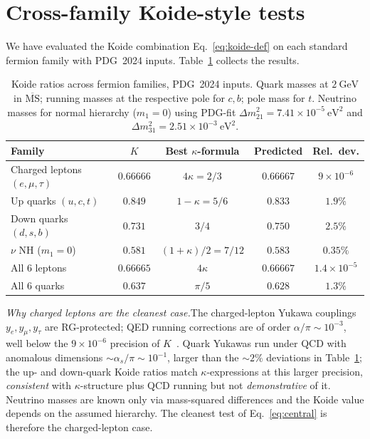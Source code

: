 \documentclass[aps,prl,reprint,amsmath,amssymb,nofootinbib,floatfix,superscriptaddress]{revtex4-2}
\newcommand{\msbar}{\overline{\mathrm{MS}}}
\begin{document}
\section{Cross-family Koide-style tests}
\label{sec:crossfamily}

We have evaluated the Koide combination Eq.~\eqref{eq:koide-def} on each standard fermion family with PDG~2024 inputs. Table~\ref{tab:crossfam} collects the results.

\begin{table}[h]
\centering
\small
\begin{tabular}{lcccc}
\toprule
Family & $K$ & Best $\kappa$-formula & Predicted & Rel.\ dev. \\
\midrule
Charged leptons $(e, \mu, \tau)$ & $0.66666$ & $4\kappa = 2/3$ & $0.66667$ & $9 \times 10^{-6}$ \\
Up quarks $(u, c, t)$ & $0.849$ & $1 - \kappa = 5/6$ & $0.833$ & $1.9\%$ \\
Down quarks $(d, s, b)$ & $0.731$ & $3/4$ & $0.750$ & $2.5\%$ \\
$\nu$ NH ($m_1 = 0$) & $0.581$ & $(1{+}\kappa)/2 = 7/12$ & $0.583$ & $0.35\%$ \\
All 6 leptons & $0.66665$ & $4\kappa$ & $0.66667$ & $1.4 \times 10^{-5}$ \\
All 6 quarks & $0.637$ & $\pi/5$ & $0.628$ & $1.3\%$ \\
\bottomrule
\end{tabular}
\caption{Koide ratios across fermion families, PDG~2024 inputs. Quark masses at $2~\mathrm{GeV}$ in $\msbar$; running masses at the respective pole for $c, b$; pole mass for $t$. Neutrino masses for normal hierarchy ($m_1 = 0$) using PDG-fit $\Delta m^2_{21} = 7.41 \times 10^{-5}~\mathrm{eV}^2$ and $\Delta m^2_{31} = 2.51 \times 10^{-3}~\mathrm{eV}^2$. \label{tab:crossfam}}
\end{table}

\textit{Why charged leptons are the cleanest case.}\quad The charged-lepton Yukawa couplings $y_e, y_\mu, y_\tau$ are RG-protected; QED running corrections are of order $\alpha/\pi \sim 10^{-3}$, well below the $9 \times 10^{-6}$ precision of $K$~\cite{Sumino2009a}. Quark Yukawas run under QCD with anomalous dimensions $\sim \alpha_s/\pi \sim 10^{-1}$, larger than the ${\sim}2\%$ deviations in Table~\ref{tab:crossfam}; the up- and down-quark Koide ratios match $\kappa$-expressions at this larger precision, \emph{consistent} with $\kappa$-structure plus QCD running but not \emph{demonstrative} of it. Neutrino masses are known only via mass-squared differences and the Koide value depends on the assumed hierarchy. The cleanest test of Eq.~\eqref{eq:central} is therefore the charged-lepton case.
\end{document}
